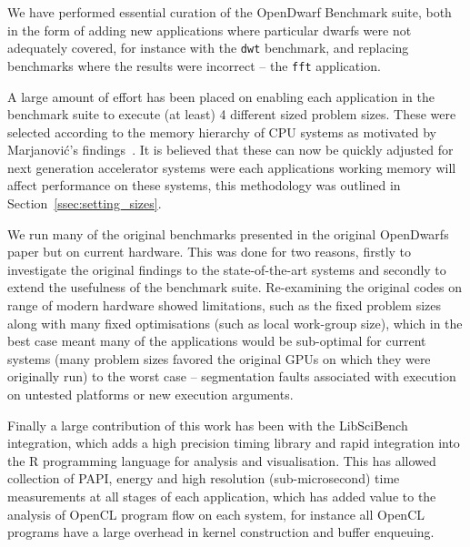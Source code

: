 \documentclass[../document.tex]{subfiles}
\begin{document}
\label{sec:conclusions}

We have performed essential curation of the OpenDwarf Benchmark suite, both in the form of adding new applications where particular dwarfs were not adequately covered, for instance with the {\tt dwt} benchmark, and replacing benchmarks where the results were incorrect -- the {\tt fft} application.

A large amount of effort has been placed on enabling each application in the benchmark suite to execute (at least) 4 different sized problem sizes.
These were selected according to the memory hierarchy of CPU systems as motivated by Marjanovi{\'c}'s findings~\cite{marjanovic2016hpc}.
It is believed that these can now be quickly adjusted for next generation accelerator systems were each applications working memory will affect performance on these systems, this methodology was outlined in Section~\ref{ssec:setting_sizes}.

We run many of the original benchmarks presented in the original OpenDwarfs~\cite{krommydas2016opendwarfs} paper but on current hardware.
This was done for two reasons, firstly to investigate the original findings to the state-of-the-art systems and secondly to extend the usefulness of the benchmark suite.
Re-examining the original codes on range of modern hardware showed limitations, such as the fixed problem sizes along with many fixed optimisations (such as local work-group size), which in the best case meant many of the applications would be sub-optimal for current systems (many problem sizes favored the original GPUs on which they were originally run) to the worst case -- segmentation faults associated with execution on untested platforms or new execution arguments.

Finally a large contribution of this work has been with the LibSciBench integration, which adds a high precision timing library and rapid integration into the R programming language for analysis and visualisation.
This has allowed collection of PAPI, energy and high resolution (sub-microsecond) time measurements at all stages of each application, which has added value to the analysis of OpenCL program flow on each system, for instance all OpenCL programs have a large overhead in kernel construction and buffer enqueuing.
\end{document}
